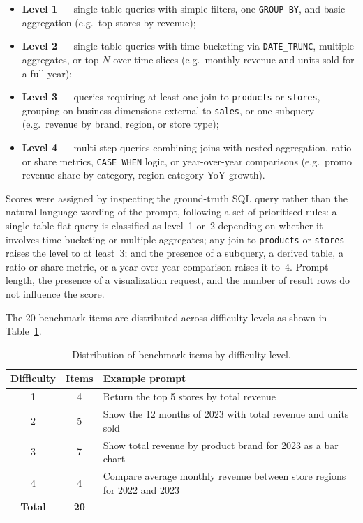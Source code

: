 \begin{itemize}
    \item \textbf{Level 1} — single-table queries with simple filters, one
          \texttt{GROUP BY}, and basic aggregation (e.g.\ top stores by revenue);
    \item \textbf{Level 2} — single-table queries with time bucketing via
          \texttt{DATE\_TRUNC}, multiple aggregates, or top-$N$ over time slices
          (e.g.\ monthly revenue and units sold for a full year);
    \item \textbf{Level 3} — queries requiring at least one join to \texttt{products}
          or \texttt{stores}, grouping on business dimensions external to
          \texttt{sales}, or one subquery (e.g.\ revenue by brand, region, or store type);
    \item \textbf{Level 4} — multi-step queries combining joins with nested
          aggregation, ratio or share metrics, \texttt{CASE WHEN} logic, or
          year-over-year comparisons (e.g.\ promo revenue share by category,
          region-category YoY growth).
\end{itemize}

Scores were assigned by inspecting the ground-truth SQL query rather than the
natural-language wording of the prompt, following a set of prioritised rules:
a single-table flat query is classified as level~1 or~2 depending on whether it
involves time bucketing or multiple aggregates; any join to \texttt{products} or
\texttt{stores} raises the level to at least~3; and the presence of a subquery,
a derived table, a ratio or share metric, or a year-over-year comparison raises it
to~4. Prompt length, the presence of a visualization request, and the number of
result rows do not influence the score.

The 20 benchmark items are distributed across difficulty levels as shown in
Table~\ref{tab:benchmark_dist}.

\begin{table}[H]
\centering
{}
\begin{tabular}{|c|c|p{7cm}|}
\hline
\rowcolor{bluePoli!30}
\textbf{Difficulty} & \textbf{Items} & \textbf{Example prompt} \T\B \\
\hline
1 & 4 & Return the top 5 stores by total revenue \T\B \\
2 & 5 & Show the 12 months of 2023 with total revenue and units sold \T\B \\
3 & 7 & Show total revenue by product brand for 2023 as a bar chart \T\B \\
4 & 4 & Compare average monthly revenue between store regions for 2022 and 2023 \T\B \\
\hline
\textbf{Total} & \textbf{20} & \T\B \\
\hline
\end{tabular}
\caption{Distribution of benchmark items by difficulty level.}
\label{tab:benchmark_dist}
\end{table}

